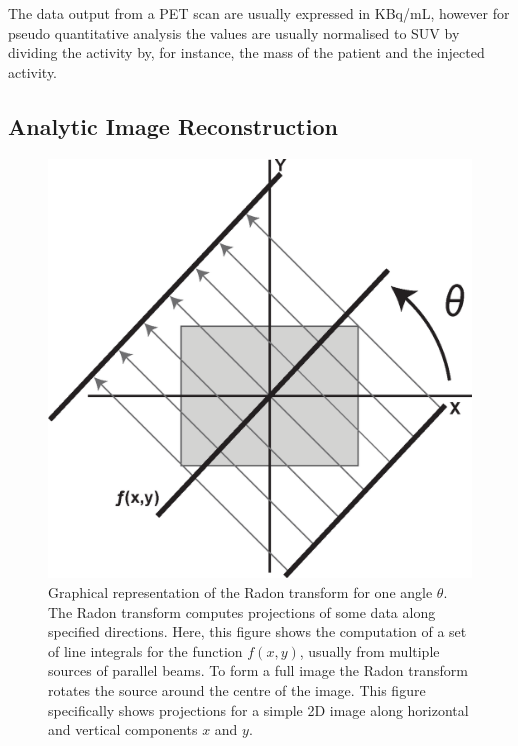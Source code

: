             The data output from a \gls{PET} scan are usually expressed in \gls{KBq/mL}, however for pseudo quantitative analysis the values are usually normalised to \gls{SUV} by dividing the activity by, for instance, the mass of the patient and the injected activity. %
        
        \subsection{Analytic Image Reconstruction} \label{sec:analytic_image_reconstruction}
            \begin{figure}
                \centering
                    
                \includegraphics[width=1.0\linewidth]{figures/background_radon_transform.png}
                    
                \captionsetup{singlelinecheck=false, justification=raggedright}
                \caption{Graphical representation of the Radon transform for one angle $\theta$. The Radon transform computes projections of some data along specified directions. Here, this figure shows the computation of a set of line integrals for the function $f(x, y)$, usually from multiple sources of parallel beams. To form a full image the Radon transform rotates the source around the centre of the image. This figure specifically shows projections for a simple \gls{2D} image along horizontal and vertical components $x$ and $y$.} \label{fig:analytic_image_reconstruction_radon_transform}
            \end{figure}
            
